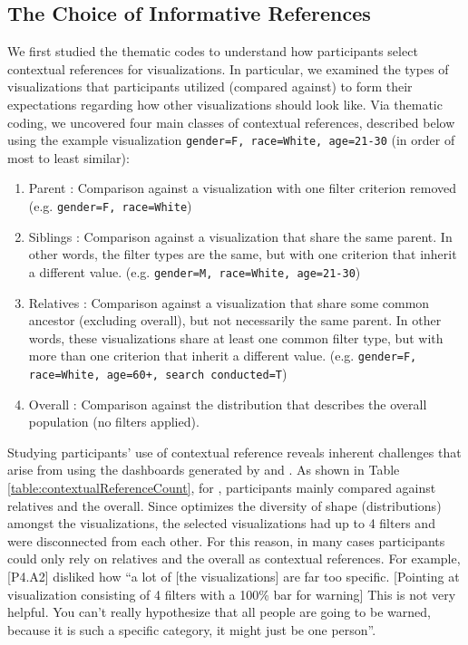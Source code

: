\subsection{The Choice of Informative References}
\par {} We first studied the thematic codes to understand how participants select contextual references for visualizations. In particular, we examined the types of visualizations that participants utilized (compared against) to form their expectations regarding how other visualizations should look like. %
Via thematic coding, we uncovered four main classes of contextual references, described below using the example visualization \texttt{gender=F, race=White, age=21-30} (in order of most to least similar):
\begin{enumerate}
	\item Parent : Comparison against a visualization with one filter criterion removed (e.g. \texttt{gender=F, race=White})
	\item Siblings : Comparison against a visualization that share the same parent. In other words, the filter types are the same, but with one criterion that inherit a different value. (e.g. \texttt{gender=M, race=White, age=21-30})
	\item Relatives : Comparison against a visualization that share some common ancestor (excluding overall), but not necessarily the same parent. In other words, these visualizations share at least one common filter type, but with more than one criterion that inherit a different value. (e.g. \texttt{gender=F, race=White, age=60+, search conducted=T})
	\item Overall : Comparison against the distribution that describes the overall population (no filters applied).
\end{enumerate}
Studying participants' use of contextual reference reveals inherent challenges that arise from using the dashboards generated by \BFS and \cluster. As shown in Table \ref{table:contextualReferenceCount}, for \cluster , participants mainly compared against relatives and the overall. Since \cluster optimizes the diversity of shape (distributions) amongst the visualizations, the selected visualizations had up to 4 filters and were disconnected from each other. For this reason, in many cases participants could only rely on relatives and the overall as contextual references. For example, [P4.A2] disliked how ``a lot of [the visualizations] are far too specific. [Pointing at visualization consisting of 4 filters with a 100\% bar for warning] This is not very helpful. You can't really hypothesize that all people are going to be warned, because it is such a specific category, it might just be one person''. %
